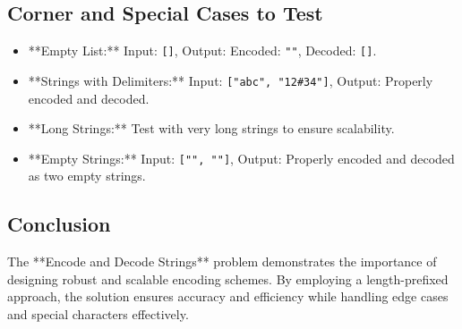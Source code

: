\subsection*{Corner and Special Cases to Test}
\begin{itemize}
    \item **Empty List:** Input: \texttt{[]}, Output: Encoded: \texttt{""}, Decoded: \texttt{[]}.
    \item **Strings with Delimiters:** Input: \texttt{["abc", "12\#34"]}, Output: Properly encoded and decoded.
    \item **Long Strings:** Test with very long strings to ensure scalability.
    \item **Empty Strings:** Input: \texttt{["", ""]}, Output: Properly encoded and decoded as two empty strings.
\end{itemize}

\subsection*{Conclusion}
The **Encode and Decode Strings** problem demonstrates the importance of designing robust and scalable encoding schemes. By employing a length-prefixed approach, the solution ensures accuracy and efficiency while handling edge cases and special characters effectively.